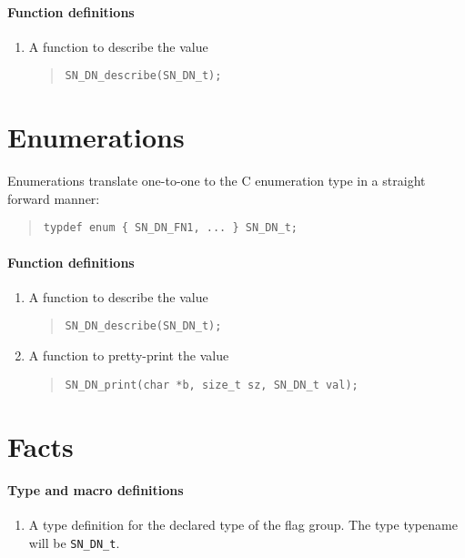 \documentclass[a4paper,11pt,twoside]{report}
\begin{document}
{{\paragraph{Function definitions}
\begin{enumerate}
  \item A function to describe the value 
        \begin{quote}
          \texttt{SN\_DN\_describe(SN\_DN\_t);}
        \end{quote}
\end{enumerate}

\section{Enumerations}
Enumerations translate one-to-one to the C enumeration type in a straight 
forward manner:

\begin{quote}
  \texttt{typdef enum \{ SN\_DN\_FN1, ... \} SN\_DN\_t; }
\end{quote}

\paragraph{Function definitions}
\begin{enumerate}
  \item A function to describe the value 
        \begin{quote}
          \texttt{SN\_DN\_describe(SN\_DN\_t);}
        \end{quote}
  \item A function to pretty-print the value
        \begin{quote}
          \texttt{SN\_DN\_print(char *b, size\_t sz, SN\_DN\_t val);}
        \end{quote}
\end{enumerate}

\section{Facts}


\paragraph{Type and macro definitions}
\begin{enumerate}
  \item A type definition for the declared type of the flag group. The 
        type typename will be \texttt{SN\_DN\_t}.
\end{enumerate}

}}
\end{document}
